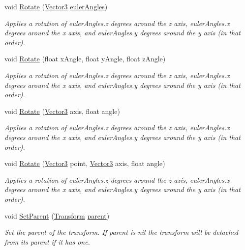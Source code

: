 \begin{DoxyCompactItemize}
void \mbox{\hyperlink{class_lua_1_1_transform_af5d67d5940a08bc18d105c884e53be84}{Rotate}} (\mbox{\hyperlink{class_lua_1_1_vector3}{Vector3}} \mbox{\hyperlink{class_lua_1_1_transform_ad9a5f0534a08dc2d6cb9ad32b6581b8d}{euler\+Angles}})
\begin{DoxyCompactList}\small\item\em Applies a rotation of euler\+Angles.\+z degrees around the z axis, euler\+Angles.\+x degrees around the x axis, and euler\+Angles.\+y degrees around the y axis (in that order). \end{DoxyCompactList}\item 
void \mbox{\hyperlink{class_lua_1_1_transform_a44f0216f90d0df765efc719bdfbccde2}{Rotate}} (float x\+Angle, float y\+Angle, float z\+Angle)
\begin{DoxyCompactList}\small\item\em Applies a rotation of euler\+Angles.\+z degrees around the z axis, euler\+Angles.\+x degrees around the x axis, and euler\+Angles.\+y degrees around the y axis (in that order). \end{DoxyCompactList}\item 
void \mbox{\hyperlink{class_lua_1_1_transform_a7f9437d0324777be34be4722a9dc52a1}{Rotate}} (\mbox{\hyperlink{class_lua_1_1_vector3}{Vector3}} axis, float angle)
\begin{DoxyCompactList}\small\item\em Applies a rotation of euler\+Angles.\+z degrees around the z axis, euler\+Angles.\+x degrees around the x axis, and euler\+Angles.\+y degrees around the y axis (in that order). \end{DoxyCompactList}\item 
void \mbox{\hyperlink{class_lua_1_1_transform_ad62f95fde354155f59cf1cf334cf3fec}{Rotate}} (\mbox{\hyperlink{class_lua_1_1_vector3}{Vector3}} point, \mbox{\hyperlink{class_lua_1_1_vector3}{Vector3}} axis, float angle)
\begin{DoxyCompactList}\small\item\em Applies a rotation of euler\+Angles.\+z degrees around the z axis, euler\+Angles.\+x degrees around the x axis, and euler\+Angles.\+y degrees around the y axis (in that order). \end{DoxyCompactList}\item 
void \mbox{\hyperlink{class_lua_1_1_transform_a44299747664c0a77b5f03f69f032a86f}{Set\+Parent}} (\mbox{\hyperlink{class_lua_1_1_transform}{Transform}} \mbox{\hyperlink{class_lua_1_1_transform_a8b6f784d7b29fbff37daec2e2001d991}{parent}})
\begin{DoxyCompactList}\small\item\em Set the parent of the transform. If parent is nil the transform will be detached from its parent if it has one. \end{DoxyCompactList}\item 

\end{DoxyCompactItemize}
